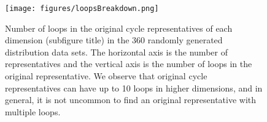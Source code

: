 \begin{figure}[h!]
\begin{center}
\texttt{[image: figures/loopsBreakdown.png]}
\end{center}
\caption{%
Number of loops in the original cycle representatives of each dimension (subfigure title) in the $360$ randomly generated distribution data sets. The horizontal axis is the number of representatives and the vertical axis is the number of loops in the original representative. We observe that original cycle representatives can have up to 10 loops in higher dimensions, and in general, it is not uncommon to find an original representative with multiple loops.} \label{fig:loopsbreakdown}
\end{figure} 
% 
